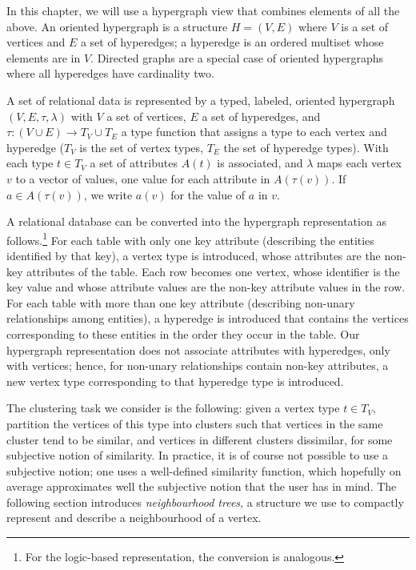 In this chapter, we will use a hypergraph view that combines elements of all the above.
An oriented hypergraph is a structure $H=(V,E)$ where $V$ is a set of vertices and $E$ a set of hyperedges; a hyperedge is an ordered multiset whose elements are in $V$.
Directed graphs are a special case of oriented hypergraphs where all hyperedges have cardinality two.


A set of relational data is represented by a typed, labeled, oriented hypergraph $(V,E,\tau,\lambda)$ with $V$ a set of vertices, $E$ a set of hyperedges, and $\tau: (V \cup E) \rightarrow T_V \cup T_E$  a type function that assigns a type to each vertex and hyperedge ($T_V$ is the set of vertex types, $T_E$ the set of hyperedge types).
With each type $t \in T_V$ a set of attributes $A(t)$ is associated, and $\lambda$ maps each vertex $v$ to a vector of values, one value for each attribute in $A(\tau(v))$.
If $a \in A(\tau(v))$, we write $a(v)$ for the value of $a$ in $v$.


A relational database can be converted into the hypergraph representation as follows.\footnote{For the logic-based representation, the conversion is analogous.}
For each table with only one key attribute (describing the entities identified by that key), a vertex type is introduced, whose attributes are the non-key attributes of the table.
Each row becomes one vertex, whose identifier is the key value and whose attribute values are the non-key attribute values in the row.
For each table with more than one key attribute (describing non-unary relationships among entities), a hyperedge is introduced that contains the vertices corresponding to these entities in the order they occur in the table.
Our hypergraph representation does not associate attributes with hyperedges, only with vertices; hence, for non-unary relationships contain non-key attributes, a new vertex type corresponding to that hyperedge type is introduced.


The clustering task we consider is the following: given a vertex type $t \in T_V$, partition the vertices of this type into clusters such that vertices in the same cluster tend to be similar, and vertices in different clusters dissimilar, for some subjective notion of similarity.
In practice, it is of course not possible to use a subjective notion; one uses a well-defined similarity function, which hopefully on average approximates well the subjective notion that the user has in mind.
The following section introduces \textit{neighbourhood trees}, a structure we use to compactly represent and describe a neighbourhood of a vertex.






